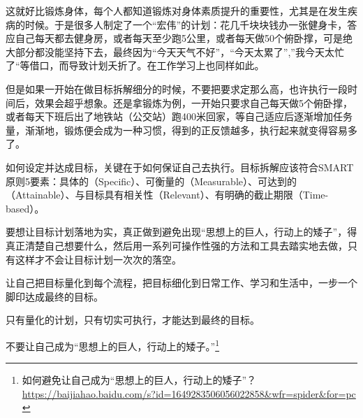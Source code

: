 这就好比锻炼身体，每个人都知道锻炼对身体素质提升的重要性，尤其是在发生疾病的时候。于是很多人制定了一个“宏伟”的计划：花几千块块钱办一张健身卡，答应自己每天都去健身房，或者每天至少跑5公里，或者每天做50个俯卧撑，可是绝大部分都没能坚持下去，最终因为“今天天气不好”，“今天太累了”,”我今天太忙了“等借口，而导致计划夭折了。在工作学习上也同样如此。

但是如果一开始在做目标拆解细分的时候，不要把要求定那么高，也许执行一段时间后，效果会超乎想象。还是拿锻炼为例，一开始只要求自己每天做5个俯卧撑，或者每天下班后出了地铁站（公交站）跑400米回家，等自己适应后逐渐增加任务量，渐渐地，锻炼便会成为一种习惯，得到的正反馈越多，执行起来就变得容易多了。

如何设定并达成目标，关键在于如何保证自己去执行。目标拆解应该符合SMART原则5要素：具体的（Specific）、可衡量的（Measurable）、可达到的（Attainable）、与目标具有相关性（Relevant）、有明确的截止期限（Time-based）。

要想让目标计划落地为实，真正做到避免出现“思想上的巨人，行动上的矮子”，得真正清楚自己想要什么，然后用一系列可操作性强的方法和工具去踏实地去做，只有这样才不会让目标计划一次次的落空。

让自己把目标量化到每个流程，把目标细化到日常工作、学习和生活中，一步一个脚印达成最终的目标。

只有量化的计划，只有切实可执行，才能达到最终的目标。

不要让自己成为“思想上的巨人，行动上的矮子。”\footnote{如何避免让自己成为“思想上的巨人，行动上的矮子”？ \quad \url{https://baijiahao.baidu.com/s?id=1649283506056022858&wfr=spider&for=pc       }}

